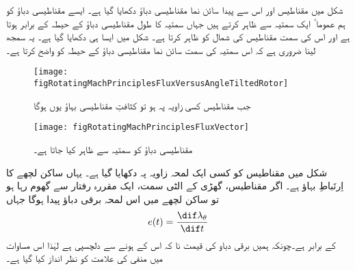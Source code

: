 شکل   میں مقناطیس اور اس سے پیدا سائن نما مقناطیسی دباؤ دکھایا گیا ہے۔ ایسے مقناطیسی دباؤ کو ہم عموما ً ایک سمتیہ سے ظاہر کرتے ہیں جہاں سمتیہ کا طول مقناطیسی دباؤ کے حیطہ کے برابر ہوتا ہے اور اس کی سمت مقناطیس کی شمال کو ظاہر کرتا ہے۔ شکل   میں ایسا ہی دکھایا گیا ہے۔ یہ سمجھ لینا ضروری ہے کہ اس سمتیہ کی سمت سائن نما مقناطیسی دباؤ کے حیطہ کو واضح کرتا ہے۔ 
\begin{figure}
\centering
\texttt{[image: figRotatingMachPrinciplesFluxVersusAngleTiltedRotor]}
\caption{جب مقناطیس کسی زاویہ پہ ہو تو کثافتِ مقناطیسی بہاؤ یوں ہوگا}
\label{شکل_گھومتے_مشین_رداس_اور_مقناطیسی_بہاو_مقناطیس_گھوما_ہے}
\end{figure}
%
\begin{figure}
\centering
\texttt{[image: figRotatingMachPrinciplesFluxVector]}
\caption{مقناطیسی دباؤ کو سمتیہ سے ظاہر کیا جاتا ہے۔}
\label{شکل_گھومتے_مشین_مقناطیسی_دباو_سمتیہ}
\end{figure}

 شکل   میں مقناطیس کو کسی ایک لمحہ   زاویہ  پہ دکھایا گیا ہے۔ یہاں ساکن لچھے کا اِرتَباطِ بہاؤ  ہے۔ اگر مقناطیس، گھڑی کے الٹی سمت، ایک مقررہ رفتار  سے  گھوم رہا ہو تو ساکن لچھے میں اس لمحہ  برقی دباؤ پیدا ہوگا جہاں
\begin{align}
e(t)=\frac{\dif \lambda_\theta}{\dif t}
\end{align}
کے برابر ہے۔چونکہ ہمیں برقی دباو کی قیمت نا کہ اس کے  ہونے سے دلچسپی ہے لہٰذا اس مساوات میں منفی کی علامت کو نظر انداز کیا گیا ہے۔

